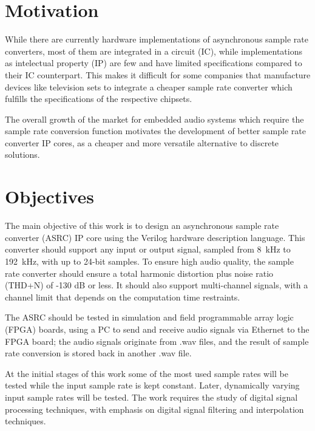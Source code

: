 \section{Motivation}
\label{section:motivation}

While there are currently hardware implementations of asynchronous sample rate
converters, most of them are integrated in a circuit (IC), while implementations
as intelectual property (IP) are few and have limited specifications compared to
their IC counterpart. This makes it difficult for some companies that
manufacture devices like television sets to integrate a cheaper sample rate
converter which fulfills the specifications of the respective chipsets.

The overall growth of the market for embedded audio systems which require the
sample rate conversion function motivates the development of better sample rate
converter IP cores, as a cheaper and more versatile alternative to discrete
solutions.

\section{Objectives}
\label{section:objectives}

The main objective of this work is to design an asynchronous sample rate
converter (ASRC) IP core using the Verilog hardware description language. This
converter should support any input or output signal, sampled from
\SI{8}{\kilo\hertz} to \SI{192}{\kilo\hertz}, with up to 24-bit samples. To
ensure high audio quality, the sample rate converter should ensure a total
harmonic distortion plus noise ratio (THD+N) of -130 dB or less. It should
also support multi-channel signals, with a channel limit that depends
on the computation time restraints.

The ASRC should be tested in simulation and field programmable array logic
(FPGA) boards, using a PC to send and receive audio signals via Ethernet to the
FPGA board; the audio signals originate from .wav files, and the result of
sample rate conversion is stored back in another .wav file.

At the initial stages of this work some of the most used sample rates will be
tested while the input sample rate is kept constant. Later, dynamically varying
input sample rates will be tested. The work requires the study of digital signal
processing techniques, with emphasis on digital signal filtering and
interpolation techniques.

